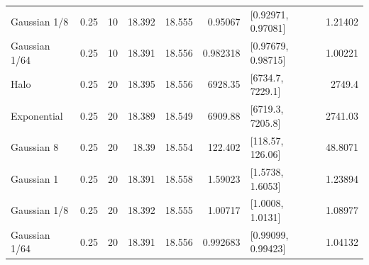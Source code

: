 \documentclass[fleqn,usenatbib]{mnras}
\begin{document}
\begin{table}
\begin{tabular}{lrrrrrlr}
Gaussian 1/8 & 0.25 & 10 & 18.392 & 18.555 & 0.95067 & [0.92971, 0.97081] & 1.21402 \\
Gaussian 1/64 & 0.25 & 10 & 18.391 & 18.556 & 0.982318 & [0.97679, 0.98715] & 1.00221 \\
Halo & 0.25 & 20 & 18.395 & 18.556 & 6928.35 & [6734.7, 7229.1] & 2749.4 \\
Exponential & 0.25 & 20 & 18.389 & 18.549 & 6909.88 & [6719.3, 7205.8] & 2741.03 \\
Gaussian 8 & 0.25 & 20 & 18.39 & 18.554 & 122.402 & [118.57, 126.06] & 48.8071 \\
Gaussian 1 & 0.25 & 20 & 18.391 & 18.558 & 1.59023 & [1.5738, 1.6053] & 1.23894 \\
Gaussian 1/8 & 0.25 & 20 & 18.392 & 18.555 & 1.00717 & [1.0008, 1.0131] & 1.08977 \\
Gaussian 1/64 & 0.25 & 20 & 18.391 & 18.556 & 0.992683 & [0.99099, 0.99423] & 1.04132 \\
\bottomrule
\end{tabular}
\end{table}
\end{document}
